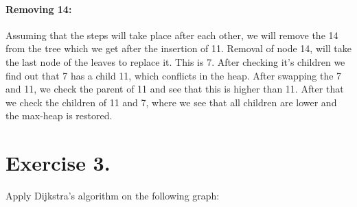 \documentclass{article}
\begin{document}
\paragraph{Removing 14:}
Assuming that the steps will take place after each other, we will remove the 14 from the tree which we get after the insertion of 11. Removal of node 14, will take the last node of the leaves to replace it. This is 7. After checking it's children we find out that 7 has a child 11, which conflicts in the heap. After swapping the 7 and 11, we check the parent of 11 and see that this is higher than 11. After that we check the children of 11 and 7, where we see that all children are lower and the max-heap is restored.
\begin{center}
\end{center}

\newpage
\section*{Exercise 3.}
Apply Dijkstra's algorithm on the following graph:
\end{document}
